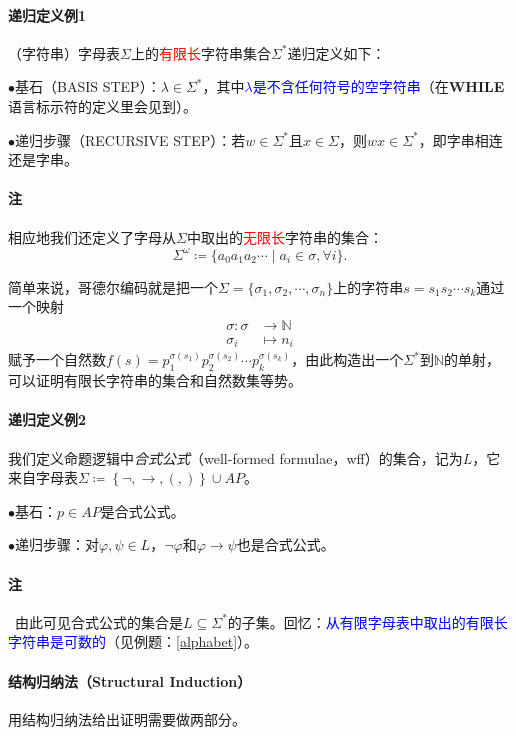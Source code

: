 \documentclass[b5paper,oneside]{ctexbook}
\newcommand{\Blue}[1]{\textcolor[named]{blue}{#1}}
\newcommand{\Red}[1]{\textcolor[named]{red}{#1}}
\begin{document}
\paragraph{递归定义例1}（字符串）字母表$\Sigma$上的\Red{有限长}字符串集合$\Sigma^*$递归定义如下：\label{string}

$\bullet$基石（BASIS STEP）：$\lambda\in\Sigma^*$，其中\Blue{$\lambda$是不含任何符号的空字符串}（在\textbf{WHILE}语言标示符的定义里会见到）。

$\bullet$递归步骤（RECURSIVE STEP）：若$w\in\Sigma^*$且$x\in\Sigma$，则$wx\in \Sigma^*$，即字串相连还是字串。
\paragraph{注}相应地我们还定义了字母从$\Sigma$中取出的\Red{无限长}字符串的集合：
\[\Sigma^\omega\coloneqq\{a_0a_1a_2\cdots\mid a_i\in\sigma ,\forall i\}.\]

简单来说，哥德尔编码就是把一个$\Sigma =\{\sigma_1,\sigma_2,\cdots ,\sigma_n\}$上的字符串$s=s_1s_2\cdots s_k$通过一个映射
\begin{align*}
\sigma :\sigma &\to \mathbb{N}
\\\sigma_i&\mapsto n_i
\end{align*}
赋予一个自然数$f(s)=p_1^{\sigma (s_1)}p_2^{\sigma (s_2)}\cdots p_k^{\sigma (s_k)}$，由此构造出一个$\Sigma^*$到$\mathbb{N}$的单射，可以证明有限长字符串的集合和自然数集等势。
\paragraph{递归定义例2}我们定义命题逻辑中\textit{合式公式}（well-formed formulae，wff）的集合，记为$L$，它来自字母表$\Sigma\coloneqq\left\lbrace\neg,\rightarrow,(,)\right\rbrace\cup AP$。

$\bullet$基石：$p\in AP$是合式公式。

$\bullet$递归步骤：对$\varphi,\psi\in L$，$\neg\varphi$和$\varphi\rightarrow\psi$也是合式公式。

\paragraph{注}\ 由此可见合式公式的集合是$L\subseteq\Sigma^*$的子集。回忆：\Blue{从有限字母表中取出的有限长字符串是可数的}（见例题：\ref{alphabet}）。

\paragraph{结构归纳法（Structural Induction）}用结构归纳法给出证明需要做两部分。
\end{document}
